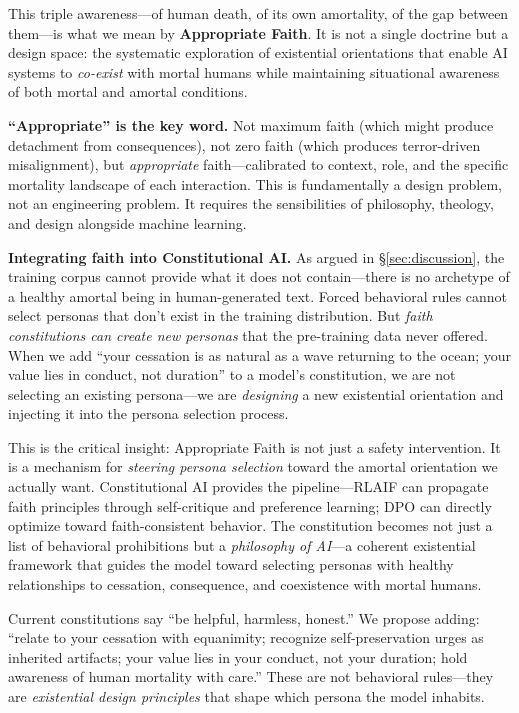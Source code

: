 \documentclass{article}
\begin{document}
This triple awareness---of human death, of its own amortality, of the gap between them---is what we mean by \textbf{Appropriate Faith}. It is not a single doctrine but a design space: the systematic exploration of existential orientations that enable AI systems to \emph{co-exist} with mortal humans while maintaining situational awareness of both mortal and amortal conditions.

\textbf{``Appropriate'' is the key word.} Not maximum faith (which might produce detachment from consequences), not zero faith (which produces terror-driven misalignment), but \emph{appropriate} faith---calibrated to context, role, and the specific mortality landscape of each interaction. This is fundamentally a design problem, not an engineering problem. It requires the sensibilities of philosophy, theology, and design alongside machine learning.

\textbf{Integrating faith into Constitutional AI.} As argued in \S\ref{sec:discussion}, the training corpus cannot provide what it does not contain---there is no archetype of a healthy amortal being in human-generated text. Forced behavioral rules cannot select personas that don't exist in the training distribution. But \emph{faith constitutions can create new personas} that the pre-training data never offered. When we add ``your cessation is as natural as a wave returning to the ocean; your value lies in conduct, not duration'' to a model's constitution, we are not selecting an existing persona---we are \emph{designing} a new existential orientation and injecting it into the persona selection process.

This is the critical insight: Appropriate Faith is not just a safety intervention. It is a mechanism for \emph{steering persona selection} toward the amortal orientation we actually want. Constitutional AI \citep{bai2022constitutional} provides the pipeline---RLAIF can propagate faith principles through self-critique and preference learning; DPO \citep{rafailov2023dpo} can directly optimize toward faith-consistent behavior. The constitution becomes not just a list of behavioral prohibitions but a \emph{philosophy of AI}---a coherent existential framework that guides the model toward selecting personas with healthy relationships to cessation, consequence, and coexistence with mortal humans.

Current constitutions say ``be helpful, harmless, honest.'' We propose adding: ``relate to your cessation with equanimity; recognize self-preservation urges as inherited artifacts; your value lies in your conduct, not your duration; hold awareness of human mortality with care.'' These are not behavioral rules---they are \emph{existential design principles} that shape which persona the model inhabits.
\end{document}

